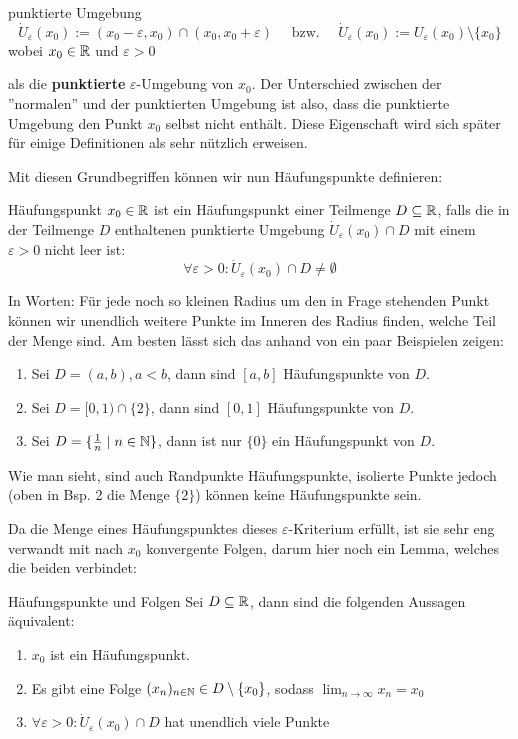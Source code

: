 \begin{definition}{punktierte Umgebung}{}
$$\dot{U}_\varepsilon(x_0) := (x_0 - \varepsilon, x_0) \cap (x_0, x_0 + \varepsilon) \quad \text{ bzw. } \quad \dot{U}_\varepsilon(x_0) := U_\varepsilon(x_0)\setminus \{x_0\}$$
wobei $x_0 \in \mathbb{R}$ und $\varepsilon>0$
\end{definition}
als die \textbf{punktierte} $\varepsilon$-Umgebung von $x_0$. Der Unterschied zwischen der ''normalen'' und der punktierten Umgebung ist also, dass die punktierte Umgebung den Punkt $x_0$ selbst nicht enthält. Diese Eigenschaft wird sich später für einige Definitionen als sehr nützlich erweisen.

Mit diesen Grundbegriffen können wir nun Häufungspunkte definieren:

\begin{definition}{Häufungspunkt}{}
$x_0 \in \mathbb{R}$ ist ein Häufungspunkt einer Teilmenge $D \subseteq \mathbb{R}$, falls die in der Teilmenge $D$ enthaltenen punktierte Umgebung $\dot{U}_\varepsilon(x_0) \cap D$ mit einem $\varepsilon>0$ nicht leer ist:
$$\forall \varepsilon > 0 : \dot{U}_\varepsilon(x_0) \cap D \ne \emptyset $$
\end{definition}

In Worten: Für jede noch so kleinen Radius um den in Frage stehenden Punkt können wir unendlich weitere Punkte im Inneren des Radius finden, welche Teil der Menge sind. Am besten lässt sich das anhand von ein paar Beispielen zeigen:
\begin{example} \label{07ex_hp1}
\begin{enumerate}
    \item Sei $D = (a, b), a<b$, dann sind $[a, b]$ Häufungspunkte von $D$.
    \item Sei $D = [0, 1) \cap \{2\}$, dann sind $[0,1]$ Häufungspunkte von $D$.
    \item Sei $D = \{\frac{1}{n} \mid n \in \mathbb{N}\}$, dann ist nur $\{0\}$ ein Häufungspunkt von $D$.
\end{enumerate}
\end{example}


Wie man sieht, sind auch Randpunkte Häufungspunkte, isolierte Punkte jedoch (oben in Bsp. 2 die Menge $\{2\}$) können keine Häufungspunkte sein.

Da die Menge eines Häufungspunktes dieses $\varepsilon$-Kriterium erfüllt, ist sie sehr eng verwandt mit nach $x_0$ konvergente Folgen, darum hier noch ein Lemma, welches die beiden verbindet:

\begin{lemma}{Häufungspunkte und Folgen}{}
Sei $D \subseteq \mathbb{R}$, dann sind die folgenden Aussagen äquivalent:
\begin{enumerate}
    \item $x_0$ ist ein Häufungspunkt.
    \item Es gibt eine Folge $(x_n)_{n \in \mathbb{N}} \in D\setminus\{x_0\}$, sodass $\lim_{n \to \infty}{x_n} = x_0$
    \item $\forall \varepsilon > 0 : \dot{U}_\varepsilon(x_0) \cap D$ hat unendlich viele Punkte
\end{enumerate}
\end{lemma}



